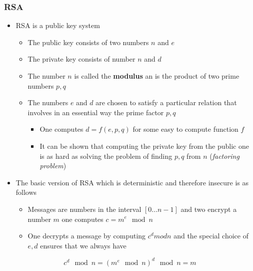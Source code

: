 \documentclass[11pt]{article}
\begin{document}
\subsubsection{RSA}
\label{sec:org2750d7f}
\begin{itemize}
\item RSA is a public key system
\begin{itemize}
\item The public key consists of two numbers \(n\) and \(e\)
\item The private key consists of number \(n\) and \(d\)
\item The number \(n\) is called the \textbf{modulus} an is the product of two prime numbers \(p,q\)
\item The numbers \(e\) and \(d\) are chosen to satisfy a particular relation that involves in an essential way the prime factor \(p,q\)
\begin{itemize}
\item One computes \(d=f(e,p,q)\) for some easy to compute function \(f\)
\item It can be shown that computing the private key from the public one is as hard as solving the problem of finding \(p,q\) from \(n\) (\emph{factoring problem})
\end{itemize}
\end{itemize}

\item The basic version of RSA which is deterministic and therefore insecure is as follows
\begin{itemize}
\item Messages are numbers in the interval \([0 \dots n-1]\) and two encrypt a number \(m\) one computes \(c=m^e \mod n\)
\item One decrypts a message by computing \(c^d mod n\) and the special choice of \(e,d\) ensures that we always have
\end{itemize}
\end{itemize}
\begin{equation}
  c^d \mod n = (m^e \mod n)^d \mod n = m
\end{equation}
\end{document}
